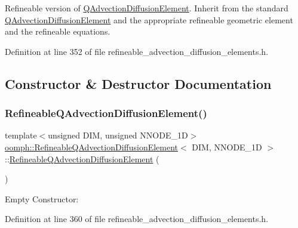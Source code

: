 Refineable version of \hyperlink{classoomph_1_1QAdvectionDiffusionElement}{Q\+Advection\+Diffusion\+Element}. Inherit from the standard \hyperlink{classoomph_1_1QAdvectionDiffusionElement}{Q\+Advection\+Diffusion\+Element} and the appropriate refineable geometric element and the refineable equations. 

Definition at line 352 of file refineable\+\_\+advection\+\_\+diffusion\+\_\+elements.\+h.



\subsection{Constructor \& Destructor Documentation}
\mbox{\label{classoomph_1_1RefineableQAdvectionDiffusionElement_afe0bc3fd117961443225cf400a7c590b}} 
\subsubsection{\texorpdfstring{Refineable\+Q\+Advection\+Diffusion\+Element()}{RefineableQAdvectionDiffusionElement()}\hspace{0.1cm}{\footnotesize\ttfamily [1/2]}}
{\footnotesize\ttfamily template$<$unsigned D\+IM, unsigned N\+N\+O\+D\+E\+\_\+1D$>$ \\
\hyperlink{classoomph_1_1RefineableQAdvectionDiffusionElement}{oomph\+::\+Refineable\+Q\+Advection\+Diffusion\+Element}$<$ D\+IM, N\+N\+O\+D\+E\+\_\+1D $>$\+::\hyperlink{classoomph_1_1RefineableQAdvectionDiffusionElement}{Refineable\+Q\+Advection\+Diffusion\+Element} (\begin{DoxyParamCaption}{ }\end{DoxyParamCaption})\hspace{0.3cm}{\ttfamily [inline]}}



Empty Constructor\+: 



Definition at line 360 of file refineable\+\_\+advection\+\_\+diffusion\+\_\+elements.\+h.

